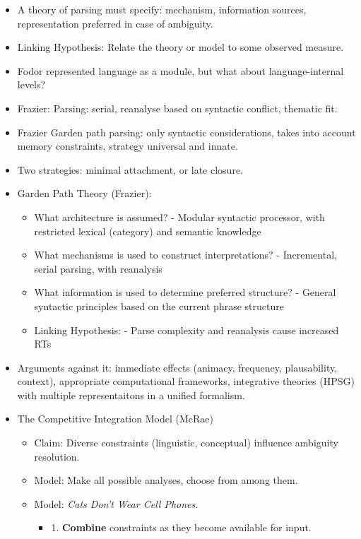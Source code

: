 \documentclass[11pt]{article}
\newenvironment{itemise}{
\begin{itemize}
  \setlength{\itemsep}{1pt}
  \setlength{\parskip}{0pt}
  \setlength{\parsep}{0pt}
}{\end{itemize}}
\begin{document}
\begin{itemise}
\begin{itemise}
  \item M: Competitive integration of constraints
 \end{itemise}
 \item A theory of parsing must specify: mechanism, information sources, representation preferred in case of ambiguity.
 \item Linking Hypothesis: Relate the theory or model to some observed measure.
 \item Fodor represented language as a module, but what about language-internal levels?
 \item Frazier: Parsing: serial, reanalyse based on syntactic conflict, thematic fit.
 \item Frazier Garden path parsing: only syntactic considerations, takes into account memory constraints, strategy universal and innate.
 \item Two strategies: minimal attachment, or late closure.
 \item Garden Path Theory (Frazier):
 \begin{itemise}
\item What architecture is assumed? -  Modular syntactic processor, with restricted lexical (category)
and semantic knowledge 
\item What mechanisms is used to construct interpretations? - Incremental, serial parsing, with reanalysis
\item What information is used to determine preferred structure? - General syntactic principles based on the current phrase structure
\item Linking Hypothesis:  - Parse complexity and reanalysis cause increased RTs
 \end{itemise}
 \item Arguments against it: immediate effects (animacy, frequency, plausability, context), appropriate computational frameworks, integrative theories (HPSG) with multiple representaitons in a unified formalism.
 \item The Competitive Integration Model (McRae)
 \begin{itemise}
 \item Claim: Diverse constraints (linguistic, conceptual) influence ambiguity resolution.
 \item Model: Make all possible analyses, choose from among them.
 \item Model: {\it Cats Don't Wear Cell Phones}.
 \begin{itemise}
 \item 1. {\bf Combine} constraints as they become available for input.

\end{itemise}
\end{itemise}
\end{itemise}
\end{document}
